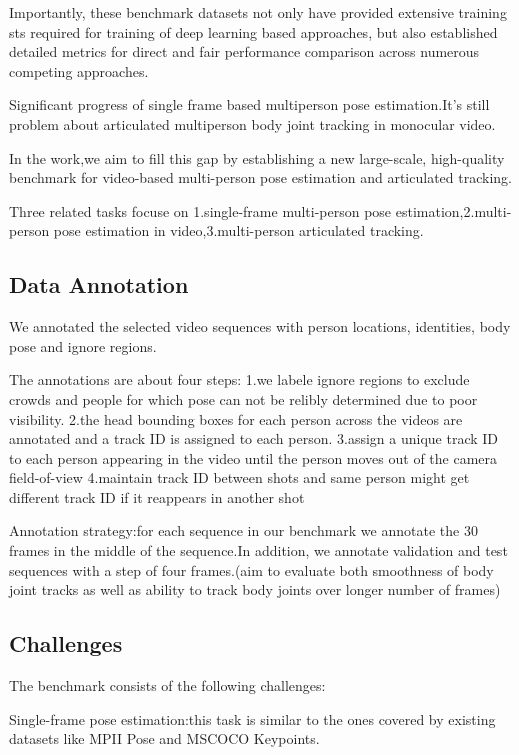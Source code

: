 \documentclass[11pt]{article}
\begin{document}
Importantly, these benchmark datasets not only have provided extensive training sts required for training of deep learning based approaches, but also established detailed metrics for direct and fair performance comparison across numerous competing approaches.

Significant progress of single frame based multiperson pose estimation.It's still problem about articulated multiperson body joint tracking in monocular video.

In the work,we aim to fill this gap by establishing a new large-scale, high-quality benchmark for video-based multi-person pose estimation and articulated tracking. 

Three related tasks focuse on 1.single-frame multi-person pose estimation,2.multi-person pose estimation in video,3.multi-person articulated tracking.

\subsection{Data Annotation}

We annotated the selected video sequences with person locations, identities, body pose and ignore regions.

The annotations are about four steps:
1.we labele ignore regions to exclude crowds and people for which pose can not be relibly determined due to poor visibility.
2.the head bounding boxes for each person across the videos are annotated and a track ID is assigned to each person.
3.assign a unique track ID to each person appearing in the video until the person moves out of the camera field-of-view
4.maintain track ID between shots and same person might get different track ID if it reappears in another shot

Annotation strategy:for each sequence in our benchmark we annotate the 30 frames in the middle of the sequence.In addition, we annotate validation and test sequences with a step of four frames.(aim to evaluate both smoothness of body joint tracks as well as ability to track body joints over longer number of frames)

\subsection{Challenges}

The benchmark consists of the following challenges:

Single-frame pose estimation:this task is similar to the ones covered by existing datasets like MPII Pose and MSCOCO Keypoints.
\end{document}

